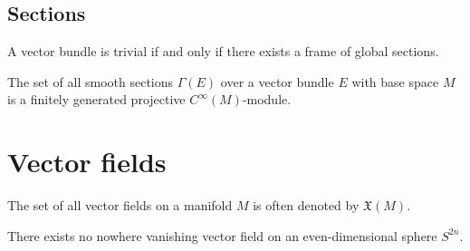 \subsection{Sections}
	
	\begin{property}\label{diff:prop:trivial_vector_bundle}
		A vector bundle is trivial if and only if there exists a frame of global sections.
	\end{property}
	
	\begin{theorem}
		The set of all smooth sections $\Gamma(E)$ over a vector bundle $E$ with base space $M$ is a finitely generated projective $C^\infty(M)$-module.
	\end{theorem}

\section{Vector fields}

	\begin{notation}
		The set of all vector fields on a manifold $M$ is often denoted by $\mathfrak{X}(M)$.
	\end{notation}
	
	\begin{theorem}
		There exists no nowhere vanishing vector field on an even-dimensional sphere $S^{2n}$.
	\end{theorem}
	
